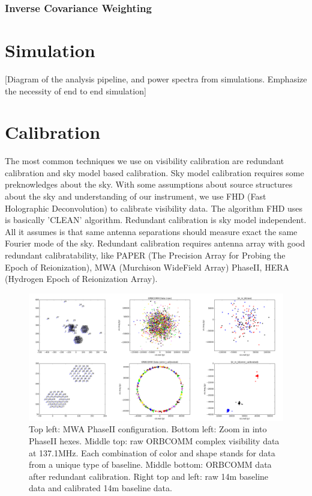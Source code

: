 \documentclass[a0,landscape]{a0poster}
\begin{document}
\begin{multicols}{4}
\subsubsection*{Inverse Covariance Weighting}





\section*{Simulation}

[Diagram of the analysis pipeline, and power spectra from simulations. Emphasize the necessity of end to end simulation]



\section*{Calibration}

The most common techniques we use on visibility calibration are redundant calibration and sky model based calibration. Sky model calibration requires some preknowledges about the sky. With some assumptions about source structures about the sky and understanding of our instrument, we use FHD (Fast Holographic Deconvolution) to calibrate visibility data. The algorithm FHD uses is basically 'CLEAN' algorithm. Redundant calibration is sky model independent. All it assumes is that same antenna separations should measure exact the same Fourier mode of the sky. Redundant calibration requires antenna array with good redundant calibratability, like PAPER (The Precision Array for Probing the Epoch of Reionization), MWA (Murchison WideField Array) PhaseII, HERA (Hydrogen Epoch of Reionization Array).

\begin{figure}[H]
\centering
\label{Redundant calibration on MWA PhaseII ORBCOMM data}
\includegraphics[width=0.85\linewidth]{figures/omnical_on_ORBCOMM.png}
\caption{Top left: MWA PhaseII configuration. Bottom left: Zoom in into PhaseII hexes. Middle top: raw ORBCOMM complex visibility data at 137.1MHz. Each combination of color and shape stands for data from a unique type of baseline. Middle bottom: ORBCOMM data after redundant calibration. Right top and left: raw 14m baseline data and calibrated 14m baseline data.}
\end{figure}



\end{multicols}
\end{document}

